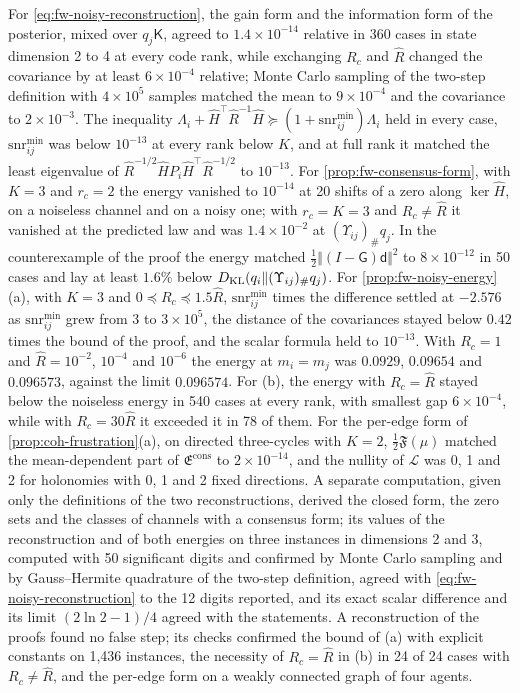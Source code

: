 \begin{numcheck}\label{chk:fw-comm-energy-noisy}
For \eqref{eq:fw-noisy-reconstruction}, the gain form and the information form of the posterior, mixed over $q_j\mathsf K$, agreed to $1.4\times10^{-14}$ relative in 360 cases in state dimension 2 to 4 at every code rank, while exchanging $R_c$ and $\hat R$ changed the covariance by at least $6\times10^{-4}$ relative; Monte Carlo sampling of the two-step definition with $4\times10^5$ samples matched the mean to $9\times10^{-4}$ and the covariance to $2\times10^{-3}$. The inequality $\Lambda_i+\hat H^\top\hat R^{-1}\hat H\succeq(1+\mathrm{snr}^{\min}_{ij})\Lambda_i$ held in every case, $\mathrm{snr}^{\min}_{ij}$ was below $10^{-13}$ at every rank below $K$, and at full rank it matched the least eigenvalue of $\hat R^{-1/2}\hat HP_i\hat H^\top\hat R^{-1/2}$ to $10^{-13}$. For \cref{prop:fw-consensus-form}, with $K=3$ and $r_c=2$ the energy vanished to $10^{-14}$ at 20 shifts of a zero along $\ker\hat H$, on a noiseless channel and on a noisy one; with $r_c=K=3$ and $R_c\ne\hat R$ it vanished at the predicted law and was $1.4\times10^{-2}$ at $(\Upsilon_{ij})_\#q_j$. In the counterexample of the proof the energy matched $\tfrac12\Vert(I-\mathsf G)\mathsf d\Vert^2$ to $8\times10^{-12}$ in 50 cases and lay at least $1.6\%$ below $D_{\mathrm{KL}}(q_i\Vert(\Upsilon_{ij})_\#q_j)$. For \cref{prop:fw-noisy-energy}(a), with $K=3$ and $0\preceq R_c\preceq1.5\hat R$, $\mathrm{snr}^{\min}_{ij}$ times the difference settled at $-2.576$ as $\mathrm{snr}^{\min}_{ij}$ grew from 3 to $3\times10^5$, the distance of the covariances stayed below $0.42$ times the bound of the proof, and the scalar formula held to $10^{-13}$. With $R_c=1$ and $\hat R=10^{-2}$, $10^{-4}$ and $10^{-6}$ the energy at $m_i=m_j$ was $0.0929$, $0.09654$ and $0.096573$, against the limit $0.096574$. For (b), the energy with $R_c=\hat R$ stayed below the noiseless energy in 540 cases at every rank, with smallest gap $6\times10^{-4}$, while with $R_c=30\hat R$ it exceeded it in 78 of them. For the per-edge form of \cref{prop:coh-frustration}(a), on directed three-cycles with $K=2$, $\tfrac12\mathfrak F(\mu)$ matched the mean-dependent part of $\mathfrak E^{\mathrm{cons}}$ to $2\times10^{-14}$, and the nullity of $\mathcal L$ was 0, 1 and 2 for holonomies with 0, 1 and 2 fixed directions. A separate computation, given only the definitions of the two reconstructions, derived the closed form, the zero sets and the classes of channels with a consensus form; its values of the reconstruction and of both energies on three instances in dimensions 2 and 3, computed with 50 significant digits and confirmed by Monte Carlo sampling and by Gauss--Hermite quadrature of the two-step definition, agreed with \eqref{eq:fw-noisy-reconstruction} to the 12 digits reported, and its exact scalar difference and its limit $(2\ln2-1)/4$ agreed with the statements. A reconstruction of the proofs found no false step; its checks confirmed the bound of (a) with explicit constants on 1,436 instances, the necessity of $R_c=\hat R$ in (b) in 24 of 24 cases with $R_c\ne\hat R$, and the per-edge form on a weakly connected graph of four agents.

\end{numcheck}
